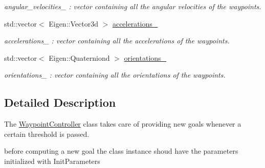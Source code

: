 \begin{DoxyCompactItemize}
\begin{DoxyCompactList}\small\item\em angular\-\_\-velocities\-\_\- \-: vector containing all the angular velocities of the waypoints. \end{DoxyCompactList}\item 
\hypertarget{class_waypoint_controller_af49bbc5e7035764fba517c9d7194f627}{std\-::vector$<$ Eigen\-::\-Vector3d $>$ \hyperlink{class_waypoint_controller_af49bbc5e7035764fba517c9d7194f627}{accelerations\-\_\-}}\label{class_waypoint_controller_af49bbc5e7035764fba517c9d7194f627}

\begin{DoxyCompactList}\small\item\em accelerations\-\_\- \-: vector containing all the accelerations of the waypoints. \end{DoxyCompactList}\item 
\hypertarget{class_waypoint_controller_a93ff74a9b72d522fc1e7ea7cd205df0b}{std\-::vector$<$ Eigen\-::\-Quaterniond $>$ \hyperlink{class_waypoint_controller_a93ff74a9b72d522fc1e7ea7cd205df0b}{orientations\-\_\-}}\label{class_waypoint_controller_a93ff74a9b72d522fc1e7ea7cd205df0b}

\begin{DoxyCompactList}\small\item\em orientations\-\_\- \-: vector containing all the orientations of the waypoints. \end{DoxyCompactList}\end{DoxyCompactItemize}


\subsection{Detailed Description}
The \hyperlink{class_waypoint_controller}{Waypoint\-Controller} class takes care of providing new goals whenever a certain threshold is passed. 

before computing a new goal the class instance shoud have the parameters initialized with Init\-Parameters 

